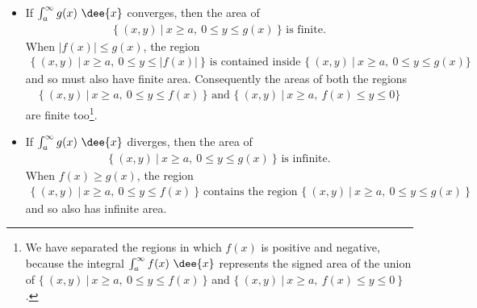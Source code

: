 \begin{itemize}
\item If $\int_a^\infty g(x)\ \dee{x}$ converges, then the area of
\begin{align*}
\big\{\ (x,y)\ \big|\ x\ge a,\ 0\le y\le g(x)\ \big\} \text{ is finite.}
\end{align*}
When $|f(x)|\le g(x)$, the region
\begin{align*}
\big\{\ (x,y)\ \big|\ x\ge a,\ 0\le y\le |f(x)|\ \big\}
\text{ is contained inside }
\big\{\ (x,y)\ \big|\ x\ge a,\ 0\le y\le g(x)\big\}
\end{align*}
and so must also have finite area. Consequently the areas
of both the regions
\begin{align*}
\big\{\ (x,y)\ \big|\ x\ge a,\ 0\le y\le f(x)\ \big\}
\text{ and }
\big\{\ (x,y)\ \big|\ x\ge a,\ f(x)\le y\le 0 \big\}
\end{align*}
are finite too\footnote{We have separated the regions in which $f(x)$ is
positive and negative, because the integral $\int_a^\infty f(x)\ \dee{x}$
represents the signed area of the union of  $\big\{\ (x,y)\ \big|\ x\ge a,\ 0\le
y\le f(x)\ \big\}$ and $\big\{\ (x,y)\ \big|\ x\ge a,\ f(x)\le y\le 0\
\big\}$.}.

\item If $\int_a^\infty g(x)\ \dee{x}$ diverges, then the area of
\begin{align*}
\big\{\ (x,y)\ \big|\ x\ge a,\ 0\le y\le g(x)\ \big\} \text{ is infinite.}
\end{align*}
When $f(x)\ge g(x)$, the region
\begin{align*}
\big\{\ (x,y)\ \big|\ x\ge a,\ 0\le y\le f(x)\ \big\}
\text{ contains the region }
\big\{\ (x,y)\ \big|\ x\ge a,\ 0\le y\le g(x)\ \big\}
\end{align*}
and so also has infinite area.
\end{itemize}

